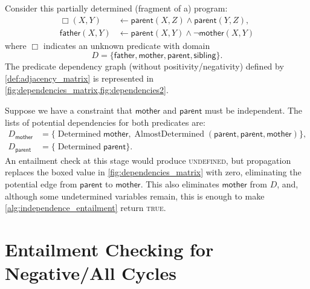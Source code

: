 \documentclass[runningheads]{llncs}
\DeclareMathOperator{\Determined}{Determined}
\DeclareMathOperator{\AlmostDetermined}{AlmostDetermined}
\begin{document}
\begin{example} \label{example:independence}
  Consider this partially determined (fragment of a) program:
  \begin{align*}
    \Box(X, Y) &\gets \mathsf{parent}(X, Z) \land \mathsf{parent}(Y, Z),\\
    \mathsf{father}(X, Y) &\gets \mathsf{parent}(X, Y) \land \neg\mathsf{mother}(X, Y)
  \end{align*}
  where $\Box$ indicates an unknown predicate with domain
  \[
    D = \{ \mathsf{father}, \mathsf{mother}, \mathsf{parent}, \mathsf{sibling}
    \}.
  \]
  The predicate dependency graph (without positivity/negativity) defined by
  \cref{def:adjacency_matrix} is represented in
  \cref{fig:dependencies_matrix,fig:dependencies2}.

  Suppose we have a constraint that $\mathsf{mother}$ and $\mathsf{parent}$ must
  be independent. The lists of potential dependencies for both predicates are:
  \begin{align*}
    D_{\mathsf{mother}} &= \{ \Determined \mathsf{mother}, \AlmostDetermined(\mathsf{parent}, \mathsf{parent}, \mathsf{mother}) \}, \\
    D_{\mathsf{parent}} &= \{ \Determined \mathsf{parent} \}.
  \end{align*}
  An entailment check at this stage would produce \textsc{undefined}, but
  propagation replaces the boxed value in \cref{fig:dependencies_matrix} with
  zero, eliminating the potential edge from $\mathsf{parent}$ to
  $\mathsf{mother}$. This also eliminates $\mathsf{mother}$ from $D$, and,
  although some undetermined variables remain, this is enough to make
  \cref{alg:independence_entailment} return \textsc{true}.
\end{example}

\section{Entailment Checking for Negative/All Cycles}
\end{document}
